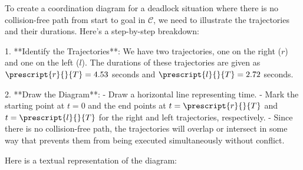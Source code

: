 To create a coordination diagram for a deadlock situation where there is no collision-free path from start to goal in \(\mathcal{C}\), we need to illustrate the trajectories and their durations. Here's a step-by-step breakdown:

1. **Identify the Trajectories**: We have two trajectories, one on the right (\(r\)) and one on the left (\(l\)). The durations of these trajectories are given as \(\prescript{r}{}{T} = 4.53\) seconds and \(\prescript{l}{}{T} = 2.72\) seconds.

2. **Draw the Diagram**:
   - Draw a horizontal line representing time.
   - Mark the starting point at \(t=0\) and the end points at \(t=\prescript{r}{}{T}\) and \(t=\prescript{l}{}{T}\) for the right and left trajectories, respectively.
   - Since there is no collision-free path, the trajectories will overlap or intersect in some way that prevents them from being executed simultaneously without conflict.

Here is a textual representation of the diagram:

